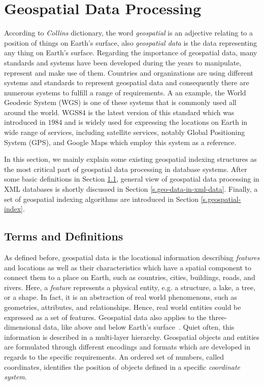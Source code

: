 \documentclass[a4paper,12pt]{article}
\begin{document}
\section{Geospatial Data Processing}
\label{s.method}
According to \emph{Collins} dictionary, the word \emph{geospatial} is an adjective relating to a position of things on Earth's surface, also \emph{geospatial data} is the data representing any thing on Earth's surface. Regarding the importance of geospatial data, many standards and systems have been developed  during the years to manipulate, represent and make use of them. Countries and organizations are using different systems and standards to represent geospatial data and consequently there are numerous systems to fulfill a range of requirements. A an example, the World Geodesic System (WGS) is one of these systems that is commonly used all around the world. WGS84 is the latest version of this standard which
was introduced in $1984$ and is widely used for expressing the locations on Earth in wide range of services, including satellite services, notably Global Positioning System (GPS), and Google Maps which employ this system as a reference.

In this section, we mainly explain some existing geospatial indexing structures as the most critical part of geospatial data processing in database systems. After some basic definitions in Section \ref{termsanddef}, general view of geospatial data processing in XML databases is shortly discussed in Section \ref{s.geo-data-in-xml-data}.
Finally, a set of geospatial indexing algorithms are introduced in Section \ref{s.geospatial-index}.

\subsection{Terms and Definitions}
\label{termsanddef}
As defined before, geospatial data is the locational information describing \textit{features} and locations as well as their characteristics which have a spatial component to connect them to a place on Earth, such as countries, cities, buildings, roads, and rivers. Here, a \textit{feature} represents a physical entity, e.g. a structure, a lake, a tree, or a shape. In fact, it is an abstraction of real world phenomenons, such as geometries, attributes, and relationships. Hence, real world entities could be expressed as a set of features.
Geospatial data also applies to the three-dimensional data, like above and below Earth's surface~\cite{powell}. Quiet often, this information is described in a multi-layer hierarchy. Geospatial objects and entities are formulated through different encodings and formats which are developed in regards to the specific requirements. An ordered set of numbers, called coordinates, identifies the position of objects  defined in a specific \textit{coordinate system}. 
\end{document}
